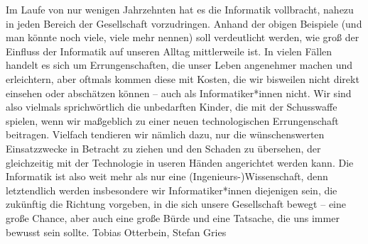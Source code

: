{Im Laufe von nur wenigen Jahrzehnten hat es die Informatik vollbracht, nahezu in jeden Bereich der Gesellschaft vorzudringen. Anhand der obigen Beispiele (und man könnte noch viele, viele mehr nennen) soll verdeutlicht werden, wie groß der Einfluss der Informatik auf unseren Alltag mittlerweile ist. In vielen Fällen handelt es sich um Errungenschaften, die unser Leben angenehmer machen und erleichtern, aber oftmals kommen diese mit Kosten, die wir bisweilen nicht direkt einsehen oder abschätzen können -- auch als Informatiker*innen nicht. Wir sind also vielmals sprichwörtlich die unbedarften Kinder, die mit der Schusswaffe spielen, wenn wir maßgeblich zu einer neuen technologischen Errungenschaft beitragen. Vielfach tendieren wir nämlich dazu, nur die wünschenswerten Einsatzzwecke in Betracht zu ziehen und den Schaden zu übersehen, der gleichzeitig mit der Technologie in useren Händen angerichtet werden kann. Die Informatik ist also weit mehr als nur eine (Ingenieurs-)Wissenschaft, denn letztendlich werden insbesondere wir Informatiker*innen diejenigen sein, die zukünftig die Richtung vorgeben, in die sich unsere Gesellschaft bewegt -- eine große Chance, aber auch eine große Bürde und eine Tatsache, die uns immer bewusst sein sollte.}
{Tobias Otterbein, Stefan Gries}
\newpage